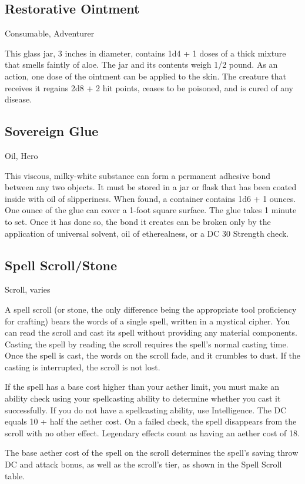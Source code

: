 \subsection{Restorative Ointment}
Consumable, Adventurer 

This glass jar, 3 inches in diameter, contains 1d4 + 1 doses of a thick mixture that smells faintly of aloe. The jar and its contents weigh 1/2 pound. As an action, one dose of the ointment can be applied to the skin. The creature that receives it regains 2d8 + 2 hit points, ceases to be poisoned, and is cured of any disease.

\subsection{Sovereign Glue}
Oil, Hero 

This viscous, milky-white substance can form a permanent adhesive bond between any two objects. It must be stored in a jar or flask that has been coated inside with oil of slipperiness. When found, a container contains 1d6 + 1 ounces.  One ounce of the glue can cover a 1-foot square surface. The glue takes 1 minute to set. Once it has done so, the bond it creates can be broken only by the application of universal solvent, oil of etherealness, or a DC 30 Strength check.

\subsection{Spell Scroll/Stone}
Scroll, varies 

A spell scroll (or stone, the only difference being the appropriate tool proficiency for crafting) bears the words of a single spell, written in a mystical cipher. You can read the scroll and cast its spell without providing any material components. Casting the spell by reading the scroll requires the spell's normal casting time. Once the spell is cast, the words on the scroll fade, and it crumbles to dust. If the casting is interrupted, the scroll is not lost.

If the spell has a base cost higher than your aether limit, you must make an ability check using your spellcasting ability to determine whether you cast it successfully. If you do not have a spellcasting ability, use Intelligence. The DC equals 10 + half the aether cost. On a failed check, the spell disappears from the scroll with no other effect. Legendary effects count as having an aether cost of 18.

The base aether cost of the spell on the scroll determines the spell's saving throw DC and attack bonus, as well as the scroll's tier, as shown in the Spell Scroll table.

